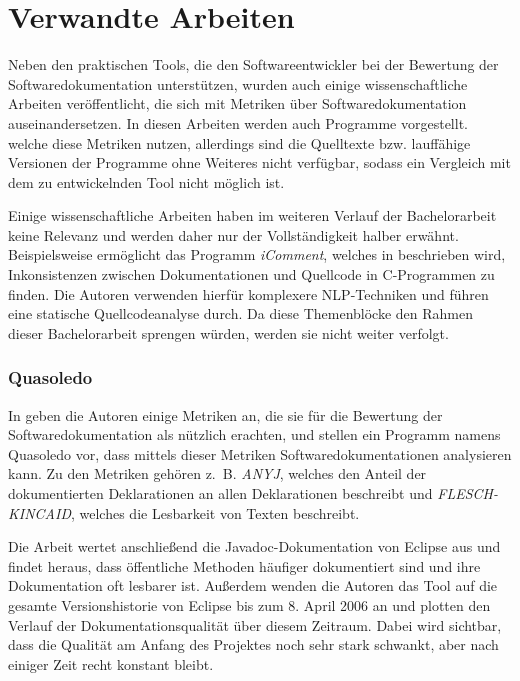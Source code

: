 \section{Verwandte Arbeiten}\label{chapter:related_science}

Neben den praktischen Tools, die den Softwareentwickler bei der Bewertung der Softwaredokumentation unterstützen, wurden auch einige wissenschaftliche Arbeiten veröffentlicht, die sich mit Metriken über Softwaredokumentation auseinandersetzen. In diesen Arbeiten werden auch Programme vorgestellt. welche diese Metriken nutzen, allerdings sind die Quelltexte bzw.  lauffähige Versionen der Programme ohne Weiteres nicht verfügbar, sodass ein Vergleich mit dem zu entwickelnden Tool nicht möglich ist. 

Einige wissenschaftliche Arbeiten haben im weiteren Verlauf der Bachelorarbeit keine Relevanz und werden daher nur der Vollständigkeit halber erwähnt. Beispielsweise ermöglicht das Programm \textit{iComment}, welches in  \cite[S.~145ff.]{icomment} beschrieben wird, Inkonsistenzen zwischen Dokumentationen und Quellcode in C-Programmen zu finden. Die Autoren verwenden hierfür komplexere \ac{NLP}-Techniken und führen eine statische Quellcodeanalyse durch. Da diese Themenblöcke den Rahmen dieser Bachelorarbeit sprengen würden, werden sie nicht weiter verfolgt.


\subsubsection{Quasoledo}\label{chapter:Quasoledo}
In \cite[S.~4-10]{HowDocumentationEvolvesoverTime} geben die Autoren einige Metriken an, die sie für die Bewertung der Softwaredokumentation als nützlich erachten, und stellen ein Programm namens \textit{}{Quasoledo} vor, dass mittels dieser Metriken Softwaredokumentationen analysieren kann. Zu den Metriken gehören z.~B.  \textit{ANYJ},  welches den Anteil der dokumentierten Deklarationen an allen Deklarationen beschreibt und \textit{FLESCH-KINCAID}, welches die Lesbarkeit von Texten beschreibt.

Die Arbeit wertet anschließend die Javadoc-Dokumentation von Eclipse aus und findet heraus, dass öffentliche Methoden häufiger dokumentiert sind und ihre Dokumentation oft lesbarer ist. Außerdem wenden die Autoren das Tool auf die gesamte Versionshistorie von Eclipse bis zum 8. April 2006 an und plotten den Verlauf der Dokumentationsqualität über diesem Zeitraum. Dabei wird sichtbar, dass die Qualität am Anfang des Projektes noch sehr stark schwankt, aber nach einiger Zeit recht konstant bleibt. 

